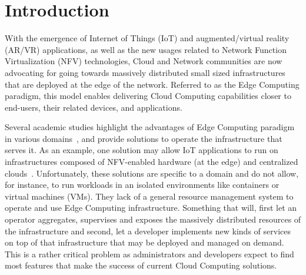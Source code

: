 
\section{Introduction}
\label{sec:intro}


With the emergence of Internet of Things (IoT) and augmented/virtual reality (AR/VR)
applications, as well as the new usages related to Network Function
Virtualization (NFV) technologies, Cloud and Network communities are now advocating
for going towards massively distributed small sized infrastructures
that are deployed at the edge of the network.
%
Referred to as the Edge Computing paradigm, this model enables delivering Cloud
Computing capabilities closer to end-users, their related devices, and applications.
%

Several academic studies highlight the advantages of Edge Computing
paradigm in various
domains~\cite{bonomi2012fog,zhang2015cloud,yi2015fog,shi2016edge,satyanarayanan2017emergence},
and provide solutions to operate the infrastructure that serves it. As
an example, one solution may allow IoT applications to run on
infrastructures composed of NFV-enabled hardware (at the edge) and
centralized clouds~\cite{bonomi2012fog}. Unfortunately, these
solutions are specific to a domain and do not allow, for instance, to
run workloads in an isolated environments like containers or virtual
machines (VMs). They lack of a general resource management system to
operate and use Edge Computing infrastructure. Something that will,
first let an operator aggregates, supervises and exposes the massively
distributed resources of the infrastructure and second, let a
developer implements new kinds of services on top of that
infrastructure that may be deployed and managed on demand. This is a
rather critical problem as administrators and developers expect to
find most features that make the success of current Cloud Computing
solutions.




